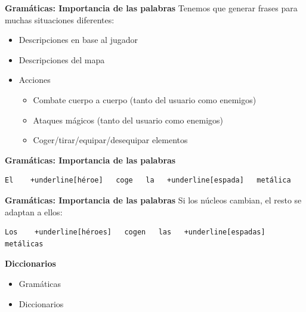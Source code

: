 \begin{frame}[t, fragile]{\textbf{Gramáticas: Importancia de las palabras}}
	Tenemos que generar frases para muchas situaciones diferentes:
	\begin{itemize}
		\item Descripciones en base al jugador
		\item Descripciones del mapa
		\item<+-| alert@+> Acciones
			\begin{itemize}
				\item Combate cuerpo a cuerpo (tanto del usuario como enemigos)
				\item Ataques mágicos (tanto del usuario como enemigos)
				\item Coger/tirar/equipar/desequipar elementos
			\end{itemize}
	\end{itemize}
\end{frame}

\begin{frame}[t, fragile]{\textbf{Gramáticas: Importancia de las palabras}}
	\vspace*{\fill}
		\begin{Verbatim}[commandchars=+\[\]]
El    +underline[héroe]   coge   la   +underline[espada]   metálica
		\end{Verbatim}
	\vspace*{\fill}
\end{frame}

\begin{frame}[t, fragile]{\textbf{Gramáticas: Importancia de las palabras}}
	Si los núcleos cambian, el resto se adaptan a ellos:
	\vspace*{\fill}
		\begin{Verbatim}[commandchars=+\[\]]
Los    +underline[héroes]   cogen   las   +underline[espadas]   metálicas
		\end{Verbatim}
	\vspace*{\fill}
\end{frame}


\begin{tframe}{\textbf{Diccionarios}}
	\begin{itemize}
		\item Gramáticas
		\item<+-| alert@+> Diccionarios
	\end{itemize}
\end{tframe}

